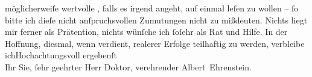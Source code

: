               möglicherweiſe wertvolle \label{K_L01792-2v}\label{K_L01792-2}, falls es irgend angeht, auf
               einmal leſen zu wollen – ſo bitte ich dieſe nicht anſpruchsvollen Zumutungen nicht zu
               mißdeuten. Nichts liegt mir ferner als Prätention, nichts wünſche ich ſoſehr als Rat
               und Hilfe. In der Hoffnung, diesmal, wenn verdient, realerer Erfolge teilhaftig zu
               werden, verbleibe ich\hspace*{1.5em}Hochachtungsvoll
               ergebenſt{\\}Ihr Sie, ſehr geehrter Herr Doktor, verehrender\pend
           \pstart \spacefill\mbox{Albert Ehrenstein.}\pend{}\endnumbering{}  
      
